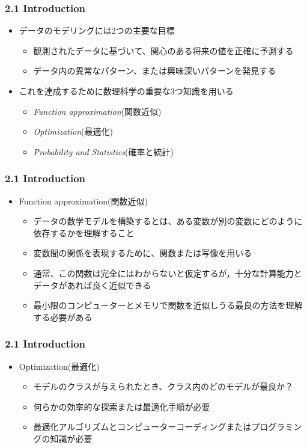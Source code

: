 \documentclass[dvipdfmx,cjk]{beamer}
\theoremstyle{example}
\begin{document}
\begin{frame}
    \frametitle{2.1 Introduction}
    \begin{itemize}
        \item データのモデリングには2つの主要な目標
              \begin{itemize}
                  \item 観測されたデータに基づいて、関心のある将来の値を正確に予測する
                  \item データ内の異常なパターン、または興味深いパターンを発見する
              \end{itemize}
        \item これを達成するために数理科学の重要な3つ知識を用いる
              \begin{itemize}
                  \item \emph{Function approximation}(関数近似)
                  \item \emph{Optimization}(最適化)
                  \item \emph{Probability and Statistics}(確率と統計)
              \end{itemize}
    \end{itemize}
\end{frame}

\begin{frame}
    \frametitle{2.1 Introduction}
    \begin{itemize}
        \item Function approximation(関数近似)
              \begin{itemize}
                  \item データの数学モデルを構築するとは、ある変数が別の変数にどのように依存するかを理解すること
                  \item 変数間の関係を表現するために、関数または写像を用いる
                  \item 通常、この関数は完全にはわからないと仮定するが，十分な計算能力とデータがあれば良く近似できる
                  \item 最小限のコンピューターとメモリで関数を近似しうる最良の方法を理解する必要がある
              \end{itemize}
    \end{itemize}
\end{frame}

\begin{frame}
    \frametitle{2.1 Introduction}
    \begin{itemize}
        \item Optimization(最適化)
              \begin{itemize}
                  \item モデルのクラスが与えられたとき、クラス内のどのモデルが最良か？
                  \item 何らかの効率的な探索または最適化手順が必要
                  \item 最適化アルゴリズムとコンピューターコーディングまたはプログラミングの知識が必要
              \end{itemize}
    \end{itemize}
\end{frame}
\end{document}
